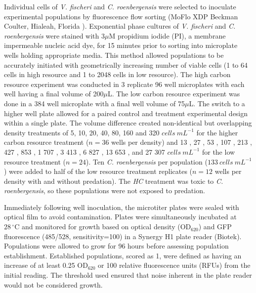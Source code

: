 \documentclass[a4paper,10pt]{article}
\begin{document}
Individual cells of \textit{V. fischeri} and \textit{C. roenbergensis} were selected to inoculate experimental populations by fluorescence flow sorting (MoFlo XDP Beckman Coulter, Hialeah, Florida ). Exponential phase cultures of \textit{V. fischeri} and \textit{C. roenbergensis} were stained with 3$\mu$M propidium iodide (PI), a membrane impermeable nucleic acid dye, for 15 minutes prior to sorting into  microplate wells holding appropriate media. This method allowed populations to be accurately initiated with geometrically increasing number of viable cells (1 to 64 cells in high resource and 1 to 2048 cells in low resource). The high carbon resource experiment was conducted in 3 replicate 96 well microplates with  each well having a final volume of 200$\mu$L. The low carbon resource experiment was done in a 384 well microplate with a final well volume of 75$\mu$L. The switch to a higher well plate allowed for a paired control and treatment experimental design within a single plate. The volume difference created non-identical but overlapping density treatments of 5, 10, 20, 40, 80, 160 and 320 $cells~mL^{-1}$ for the higher carbon resource treatment ($n=36$ wells per density) and  13 , 27 , 53 , 107 , 213 , 427 , 853 , 1 707 , 3 413 , 6 827 , 13 653 , and 27 307 $cells~mL^{-1}$ for the low resource treatment ($n=24$). Ten \textit{C. roenbergensis} per population ($133~cells~mL^{-1}$)  were added to half of the low resource treatment replicates ($n=12$ wells per density with and without predation). The \textit{HC} treatment was toxic to \textit{C. roenbergensis}, so these populations were not exposed to predation.  


Immediately following well inoculation, the microtiter plates were sealed with optical film to avoid contamination. Plates were simultaneously incubated at $28\,^{\circ}\mathrm{C}$ and monitored for growth based on optical density (OD$_{620}$) and GFP fluorescence (485/528, sensitivity=100) in a Synergy H1 plate reader (Biotek). Populations were allowed to grow for 96 hours before assessing population establishment. Established populations, scored as 1, were defined as having an increase of at least 0.25 OD$_{620}$ or 100 relative fluorescence units (RFUs) from the initial reading. The threshold used ensured that noise inherent in the plate reader would not be considered growth. 
\end{document}

